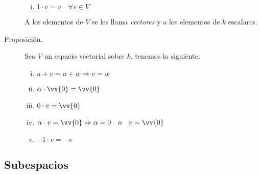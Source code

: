 \documentclass[12pt]{article}
\begin{document}
\begin{description}
\begin{enumerate}[i)]
\item
\begin{math}
	1 \cdot v = v \quad \forall v \in V
\end{math}

\end{enumerate}

A los elementos de $V$ se les llama \emph{vectores} y a los elementos de $k$ escalares.

\item [Proposición.] Sea $V$ un espacio vectorial sobre $k$, tenemos lo siguiente:

\begin{enumerate}[i)]

\item
\begin{math}
	u + v = u + w \Rightarrow v = w
\end{math}

\item
\begin{math}
	\alpha \cdot \vv{0} = \vv{0}
\end{math}

\item
\begin{math}
	0 \cdot v = \vv{0}
\end{math}

\item
\begin{math}
	\alpha \cdot v = \vv{0} \Rightarrow \alpha = 0 \quad o \quad v = \vv{0}
\end{math}

\item
\begin{math}
	-1 \cdot v = -v
\end{math}

\end{enumerate}
\end{description}
\subsection{Subespacios}
\end{document}
